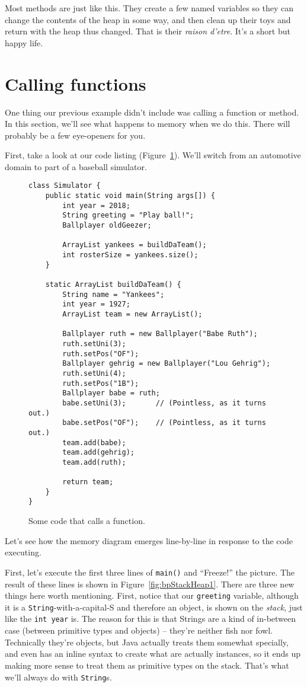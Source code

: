 Most methods are just like this. They create a few named variables so they can
change the contents of the heap in some way, and then clean up their toys
and return with the heap thus changed. That is their \textit{raison d'etre}.
It's a short but happy life.


\section{Calling functions}

One thing our previous example didn't include was calling a function or
method. In this section, we'll see what happens to memory when we do this.
There will probably be a few eye-openers for you.

First, take a look at our code listing (Figure~\ref{fig:functionCode}). We'll
switch from an automotive domain to part of a baseball simulator.

\begin{figure}[ht]
\centering
\begin{Verbatim}[fontsize=\footnotesize,samepage=true,frame=single]
class Simulator {
    public static void main(String args[]) {
        int year = 2018;
        String greeting = "Play ball!";
        Ballplayer oldGeezer;

        ArrayList yankees = buildDaTeam();
        int rosterSize = yankees.size();
    }

    static ArrayList buildDaTeam() {
        String name = "Yankees";
        int year = 1927;
        ArrayList team = new ArrayList();

        Ballplayer ruth = new Ballplayer("Babe Ruth");
        ruth.setUni(3);
        ruth.setPos("OF");
        Ballplayer gehrig = new Ballplayer("Lou Gehrig");
        ruth.setUni(4);
        ruth.setPos("1B");
        Ballplayer babe = ruth;
        babe.setUni(3);       // (Pointless, as it turns out.)
        babe.setPos("OF");    // (Pointless, as it turns out.)
        team.add(babe);
        team.add(gehrig);
        team.add(ruth);
        
        return team;
    }
}
\end{Verbatim}
\caption{Some code that calls a function.}
\label{fig:functionCode}
\end{figure}

Let's see how the memory diagram emerges line-by-line in response to the code
executing.

First, let's execute the first three lines of \texttt{main()} and ``Freeze!''
the picture. The result of these lines is shown in
Figure~\ref{fig:bpStackHeap1}. There are three new things here worth
mentioning. First, notice that our \texttt{greeting} variable, although it is
a \texttt{String}-with-a-capital-S and therefore an object, is shown on the
\textit{stack}, just like the \texttt{int year} is. The reason for this is
that Strings are a kind of in-between case (between primitive types and
objects) -- they're neither fish nor fowl. Technically they're objects, but
Java actually treats them somewhat specially, and even has an inline syntax to
create what are actually instances, so it ends up making more sense to treat
them as primitive types on the stack. That's what we'll always do with
\texttt{String}s.


